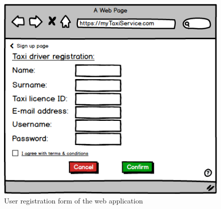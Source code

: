 \begin{figure}[H]
        \centering
        \includegraphics[width=\textwidth]{./Mockups/RegistrationWeb.png}
        \caption{User registration form of the web application}
\end{figure}

